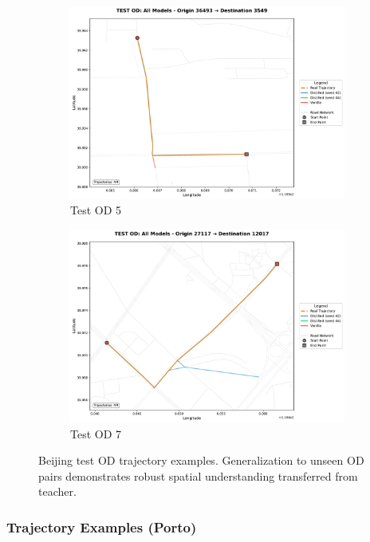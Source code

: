 \begin{figure}[H]
\begin{subfigure}{0.49\linewidth}
        \includegraphics[width=\linewidth]{assets/plots/eval/beijing/trajectories/test_od_comparison_5_origin36493_dest3549.pdf}
        \caption{Test OD 5}
    \end{subfigure}
    \begin{subfigure}{0.49\linewidth}
        \centering
        \includegraphics[width=\linewidth]{assets/plots/eval/beijing/trajectories/test_od_comparison_7_origin27117_dest12017.pdf}
        \caption{Test OD 7}
    \end{subfigure}
    \caption{Beijing test OD trajectory examples. Generalization to unseen OD pairs demonstrates robust spatial understanding transferred from teacher.}
    \label{fig:appendix-beijing-traj-test}
\end{figure}

\subsubsection{Trajectory Examples (Porto)}
\label{app:traj-porto}

